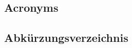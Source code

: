 %
%
%
%
\begin{en}
\chapter{Acronyms}
\end{en}
\begin{de}
\chapter{Abk\"urzungsverzeichnis}
\end{de}
\label{sec:acronyms}
%
